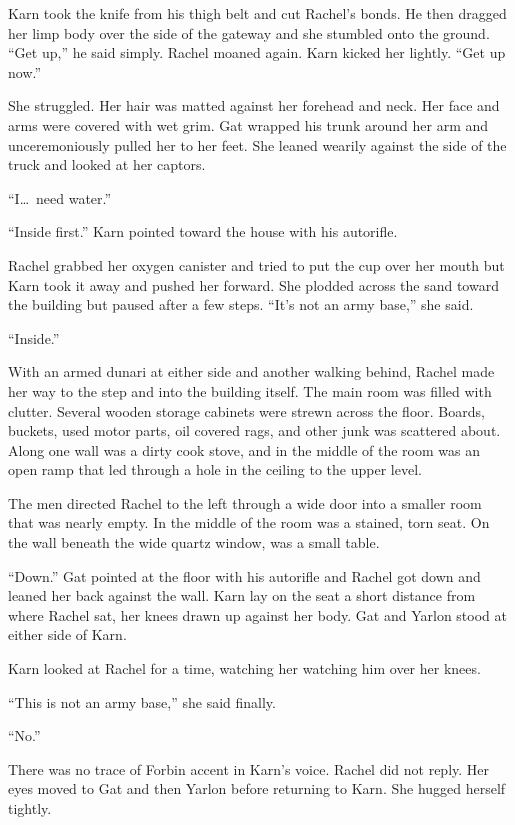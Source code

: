 Karn took the knife from his thigh belt and cut Rachel's bonds. He then dragged her limp body
over the side of the gateway and she stumbled onto the ground. ``Get up,'' he said simply.
Rachel moaned again. Karn kicked her lightly. ``Get up now.''

She struggled. Her hair was matted against her forehead and neck. Her face and arms were covered
with wet grim. Gat wrapped his trunk around her arm and unceremoniously pulled her to her feet.
She leaned wearily against the side of the truck and looked at her captors.

``I\ldots\ need water.''

``Inside first.'' Karn pointed toward the house with his autorifle.

Rachel grabbed her oxygen canister and tried to put the cup over her mouth but Karn took it away
and pushed her forward. She plodded across the sand toward the building but paused after a few
steps. ``It's not an army base,'' she said.

``Inside.''

With an armed dunari at either side and another walking behind, Rachel made her way to the step
and into the building itself. The main room was filled with clutter. Several wooden storage
cabinets were strewn across the floor. Boards, buckets, used motor parts, oil covered rags, and
other junk was scattered about. Along one wall was a dirty cook stove, and in the middle of the
room was an open ramp that led through a hole in the ceiling to the upper level.

The men directed Rachel to the left through a wide door into a smaller room that was nearly
empty. In the middle of the room was a stained, torn seat. On the wall beneath the wide quartz
window, was a small table.

``Down.'' Gat pointed at the floor with his autorifle and Rachel got down and leaned her back
against the wall. Karn lay on the seat a short distance from where Rachel sat, her knees drawn
up against her body. Gat and Yarlon stood at either side of Karn.

Karn looked at Rachel for a time, watching her watching him over her knees.

``This is not an army base,'' she said finally.

``No.''

There was no trace of Forbin accent in Karn's voice. Rachel did not reply. Her eyes moved to Gat
and then Yarlon before returning to Karn. She hugged herself tightly.

